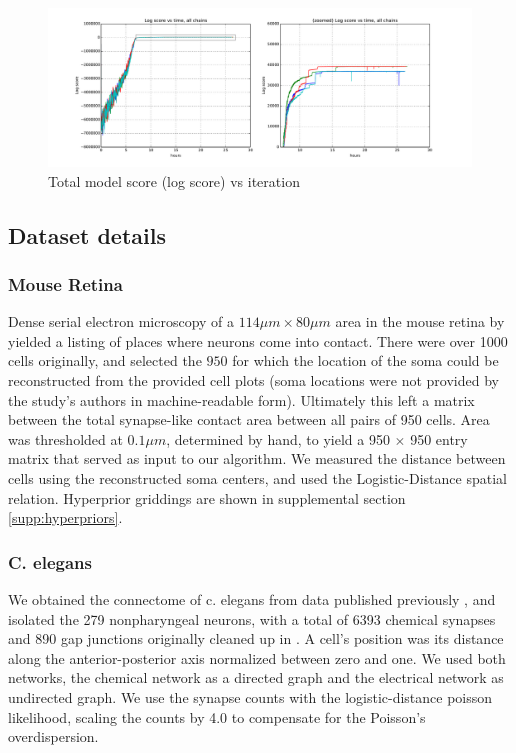 \documentclass{article}
\begin{document}
\begin{figure}
  \centering 
  \centerline{\includegraphics[width=130mm]{mixing.scorevstime.pdf}}
  \caption{Total model score (log score) vs iteration}
\label{fig:mixing:scorevstime}
\end{figure}

\subsection*{Dataset details}
\subsubsection* {Mouse Retina}
\label{supp:mouseretina}
Dense serial electron microscopy of a $114\mu m \times 80 \mu m $ area
in the mouse retina by \autocite{Helmstaedter2013} yielded a listing
of places where neurons come into contact. There were over 1000 cells
originally, and selected the $950$ for which the location of the soma
could be reconstructed from the provided cell plots (soma locations
were not provided by the study's authors in machine-readable
form). Ultimately this left a matrix between the total synapse-like
contact area between all pairs of 950 cells. Area was thresholded at
$0.1\mu m$, determined by hand, to yield a 950 $\times$ 950 entry
matrix that served as input to our algorithm. We measured the distance
between cells using the reconstructed soma centers, and used the
Logistic-Distance spatial relation. Hyperprior griddings are shown in
supplemental section \ref{supp:hyperpriors}.

\subsubsection*{C. elegans}

We obtained the connectome of c. elegans from data published
previously \autocite{Varshney2011}, and isolated the 279 nonpharyngeal
neurons, with a total of 6393 chemical synapses and 890 gap junctions
originally cleaned up in \autocite{Chen2006}. A cell's position was
its distance along the anterior-posterior axis normalized between zero
and one. We used both networks, the chemical network as a directed
graph and the electrical network as undirected graph. We use the
synapse counts with the logistic-distance poisson likelihood, scaling
the counts by 4.0 to compensate for the Poisson's overdispersion.
\end{document}
